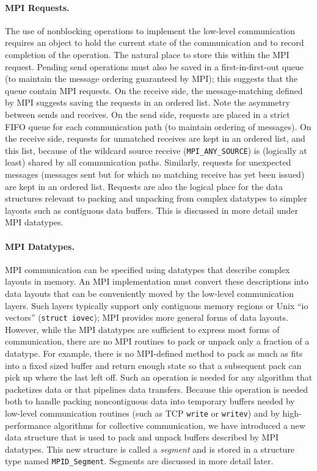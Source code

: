 \documentclass{article}
\def\code#1{\texttt{#1}}
\begin{document}
\paragraph{MPI Requests.}
The use of nonblocking operations to implement the low-level
communication requires an object to hold the current state of the
communication and to record completion of the operation.  The natural
place to store this within the MPI request.  Pending send operations must
also be saved in a first-in-first-out queue (to maintain the message
ordering guaranteed by MPI); this suggests that the queue contain MPI
requests.  On the receive side, the message-matching defined by MPI
suggests saving the requests in an ordered list.  Note the asymmetry
between sends and receives.  On the send side, requests are placed in
a strict FIFO queue for each communication path (to maintain ordering
of messages).  On the receive side, requests for unmatched receives
are kept in an ordered 
list, and this list, because of the wildcard source receive
(\code{MPI_ANY_SOURCE}) is (logically at least) shared by all
communication paths.  Similarly, requests for unexpected messages
(messages sent but for which no matching receive has yet been issued)
are kept in an ordered list.
Requests are also the logical place for the data structures relevant to packing and
unpacking from complex datatypes to simpler layouts such as contiguous
data buffers.  This is discussed in more detail under MPI datatypes.

\paragraph{MPI Datatypes.}
MPI communication can be specified using datatypes that describe
complex layouts in memory.  An MPI implementation must convert these
descriptions into data layouts that can be conveniently moved by the
low-level communication layers.  Such layers typically support only
contiguous memory regions or Unix ``io vectors'' (\code{struct
iovec}); MPI provides more general forms of data layouts.  However,
while the MPI datatypes are sufficient to express most forms of
communication, there are no MPI routines to pack or unpack only a
fraction of a datatype.  For example, there is no MPI-defined method
to pack as much as fits into a fixed sized buffer and return enough
state so that a subsequent pack can pick up where the last left off.
Such an operation is needed for any algorithm that packetizes data or
that pipelines data transfers.  Because this operation is needed both
to handle packing noncontiguous data into temporary buffers needed by
low-level communication routines (such as TCP \code{write} or
\code{writev}) and by high-performance algorithms for collective
communication, we have introduced a new data structure that is used to
pack and unpack buffers described by MPI datatypes.  This new
structure is called a \emph{segment} and is stored in a structure
type named \code{MPID_Segment}.  Segments are discussed in more
detail later. 
\end{document}
